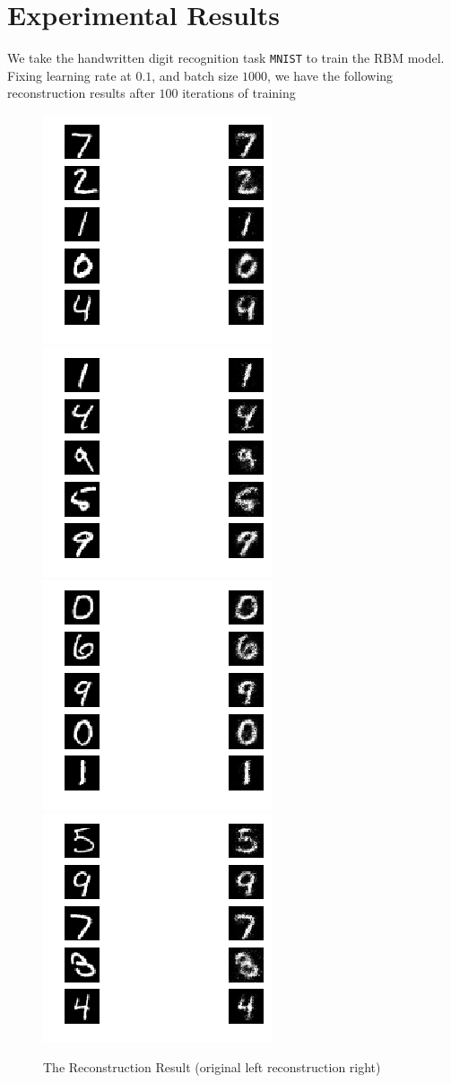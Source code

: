 \documentclass[10pt]{article}
\begin{document}
\section{Experimental Results}
We take the handwritten digit recognition task \texttt{MNIST} to train the RBM model. Fixing learning rate at $0.1$, and batch size $1000$, we have the following reconstruction results after $100$ iterations of training
\begin{figure}[H]
\centering
\includegraphics[scale=.7]{exp1.png}
\includegraphics[scale=.7]{exp2.png}
\includegraphics[scale=.7]{exp3.png}
\includegraphics[scale=.7]{exp4.png}
\caption{The Reconstruction Result (original left reconstruction right)}
\end{figure}
\end{document}
